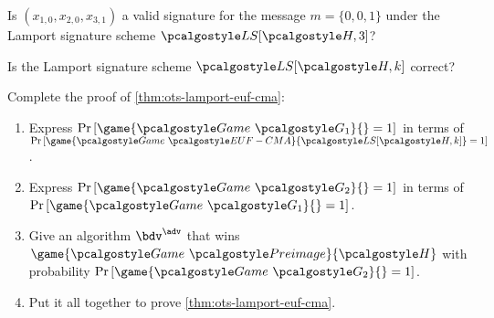 \begin{exercise}
  Is $(x_{1,0}, x_{2,0}, x_{3,1})$ a valid signature for the message $m = \{0, 0, 1\}$ under the Lamport signature scheme $\algo{LS}[\algo{H, 3}]$?
\end{exercise}

\begin{exercise}
  Is the Lamport signature scheme $\algo{LS}[\algo{H, k}]$ correct?
\end{exercise}

\begin{exercise}
  \label{ex:ots-lamport-euf-cma}
  Complete the proof of \autoref{thm:ots-lamport-euf-cma}:
  \begin{enumerate}
      \item Express $\pr{\game{\Game~\algo{G_1}}{} = 1}$ in terms of $\pr{\game{\Game~\algo{EUF-CMA}}{\algo{LS[\algo{H}, k]}} = 1}$.
      \item Express $\pr{\game{\Game~\algo{G_2}}{} = 1}$ in terms of $\pr{\game{\Game~\algo{G_1}}{} = 1}$.
      \item Give an algorithm $\bdv^\adv$ that wins $\game{\Game~\algo{Preimage}}{\algo{H}}$ with probability $\pr{\game{\Game~\algo{G_2}}{} = 1}$.
      \item Put it all together to prove \autoref{thm:ots-lamport-euf-cma}.
  \end{enumerate}
\end{exercise}

